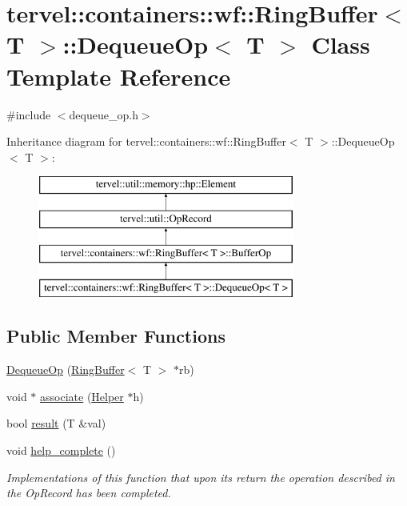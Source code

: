 \hypertarget{classtervel_1_1containers_1_1wf_1_1_ring_buffer_1_1_dequeue_op}{}\section{tervel\+:\+:containers\+:\+:wf\+:\+:Ring\+Buffer$<$ T $>$\+:\+:Dequeue\+Op$<$ T $>$ Class Template Reference}
\label{classtervel_1_1containers_1_1wf_1_1_ring_buffer_1_1_dequeue_op}


{\ttfamily \#include $<$dequeue\+\_\+op.\+h$>$}

Inheritance diagram for tervel\+:\+:containers\+:\+:wf\+:\+:Ring\+Buffer$<$ T $>$\+:\+:Dequeue\+Op$<$ T $>$\+:\begin{figure}[H]
\begin{center}
\leavevmode
\includegraphics[height=4.000000cm]{classtervel_1_1containers_1_1wf_1_1_ring_buffer_1_1_dequeue_op}
\end{center}
\end{figure}
\subsection*{Public Member Functions}
\begin{DoxyCompactItemize}
\item 
\hyperlink{classtervel_1_1containers_1_1wf_1_1_ring_buffer_1_1_dequeue_op_ae05d7c29cc4e246da4c595bbecb52ae2}{Dequeue\+Op} (\hyperlink{classtervel_1_1containers_1_1wf_1_1_ring_buffer}{Ring\+Buffer}$<$ T $>$ $\ast$rb)
\item 
void $\ast$ \hyperlink{classtervel_1_1containers_1_1wf_1_1_ring_buffer_1_1_dequeue_op_a9c2398124db300ce3b28e3541e48d347}{associate} (\hyperlink{classtervel_1_1containers_1_1wf_1_1_ring_buffer_1_1_helper}{Helper} $\ast$h)
\item 
bool \hyperlink{classtervel_1_1containers_1_1wf_1_1_ring_buffer_1_1_dequeue_op_a87e54fafb11b49f95230ca72f035d20e}{result} (T \&val)
\item 
void \hyperlink{classtervel_1_1containers_1_1wf_1_1_ring_buffer_1_1_dequeue_op_a0f798edd2a65caf9ce112b496c27bdd5}{help\+\_\+complete} ()
\begin{DoxyCompactList}\small\item\em Implementations of this function that upon its return the operation described in the Op\+Record has been completed. \end{DoxyCompactList}\end{DoxyCompactItemize}
